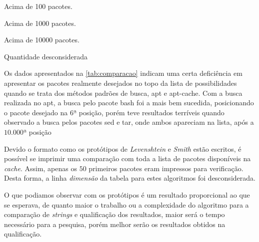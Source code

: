 \begin{table}[htbp]
\label{tab:comparacao}
\begin{description}
	\tiny
	\item [*] Acima de 100 pacotes.
	\item [**] Acima de 1000 pacotes.
	\item [***] Acima de 10000 pacotes.
	\item [$-$] Quantidade desconsiderada
\end{description}

\end{table}


Os dados apresentados na \autoref{tab:comparacao} indicam uma certa deficiência em apresentar os pacotes realmente desejados no topo da lista de possibilidades quando se trata dos métodos padrões de busca, {\code apt} e {\code apt-cache}. Com a busca realizada no {\code apt}, a busca pelo pacote {\code bash} foi a mais bem sucedida, posicionando o pacote desejado na $6ª$ posição, porém teve resultados terríveis quando observado a busca pelos pacotes {\code sed} e {\code tar}, onde ambos apareciam na lista, após a $10.000ª$ posição



Devido o formato como os protótipos de \textit{Levenshtein} e \textit{Smith} estão escritos, é possível se imprimir uma comparação com toda a lista de pacotes disponíveis na \textit{cache}. Assim, apenas os $50$ primeiros pacotes eram impressos para verificação. Desta forma, a linha \textit{dimensão} da tabela para estes algoritmos foi desconsiderada.

O que podiamos observar com os protótipos é um resultado proporcional ao que se esperava, de quanto maior o trabalho ou a complexidade do algoritmo para a comparação de \textit{strings} e qualificação dos resultados, maior será o tempo necessário para a pesquisa, porém melhor serão os resultados obtidos na qualificação.


